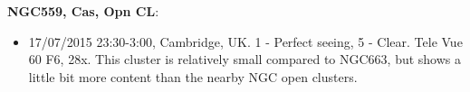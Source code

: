 {\bf NGC559, Cas, Opn CL}:
\begin{itemize}
\item 17/07/2015 23:30-3:00, Cambridge, UK. 1 - Perfect seeing, 5 - Clear. Tele Vue 60 F6, 28x. This cluster is relatively small compared to NGC663, but shows a little bit more content than the nearby NGC open clusters.
\end{itemize}
